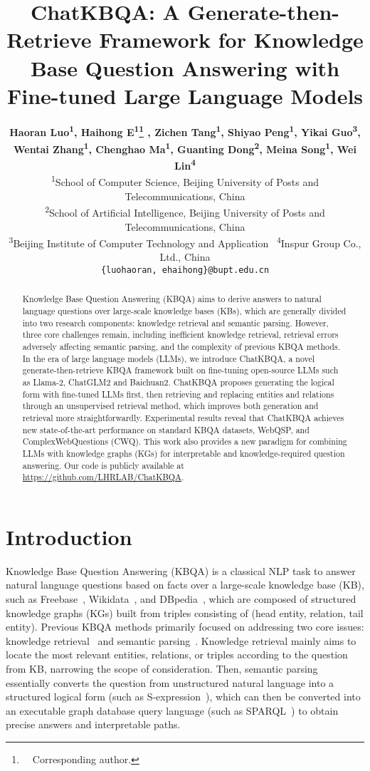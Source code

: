 \documentclass{article} \usepackage{iclr2024_conference,times}
\title{ChatKBQA: A Generate-then-Retrieve Framework for Knowledge Base Question Answering with Fine-tuned Large Language Models}
\author{{\bf Haoran Luo\textsuperscript{\rm 1}, Haihong E\textsuperscript{\rm 1}\thanks{\ \ Corresponding author.}  , Zichen Tang\textsuperscript{\rm 1}, Shiyao Peng\textsuperscript{\rm 1}, Yikai Guo\textsuperscript{\rm 3},} \\{\bf Wentai Zhang\textsuperscript{\rm 1}, Chenghao Ma\textsuperscript{\rm 1}, Guanting Dong\textsuperscript{\rm 2}, Meina Song\textsuperscript{\rm 1}, Wei Lin\textsuperscript{\rm 4}} \\
         \textsuperscript{1}School of Computer Science, Beijing University of Posts and Telecommunications, China \\ 
         \textsuperscript{2}School of Artificial Intelligence, Beijing University of Posts and Telecommunications, China \\ 
         \textsuperscript{3}Beijing Institute of Computer Technology and Application 
         \ \textsuperscript{4}Inspur Group Co., Ltd., China \\ 
         \texttt{\{luohaoran, ehaihong\}@bupt.edu.cn}}
\begin{document}
\maketitle

\begin{abstract}
Knowledge Base Question Answering (KBQA) aims to derive answers to natural language questions over large-scale knowledge bases (KBs), which are generally divided into two research components: knowledge retrieval and semantic parsing. However, three core challenges remain, including inefficient knowledge retrieval, retrieval errors adversely affecting semantic parsing, and the complexity of previous KBQA methods. In the era of large language models (LLMs), we introduce ChatKBQA, a novel generate-then-retrieve KBQA framework built on fine-tuning open-source LLMs such as Llama-2, ChatGLM2 and Baichuan2. ChatKBQA proposes generating the logical form with fine-tuned LLMs first, then retrieving and replacing entities and relations through an unsupervised retrieval method, which improves both generation and retrieval more straightforwardly. Experimental results reveal that ChatKBQA achieves new state-of-the-art performance on standard KBQA datasets, WebQSP, and ComplexWebQuestions (CWQ). This work also provides a new paradigm for combining LLMs with knowledge graphs (KGs) for interpretable and knowledge-required question answering. 
Our code is publicly available at \url{https://github.com/LHRLAB/ChatKBQA}.

\end{abstract}

\section{Introduction}

Knowledge Base Question Answering (KBQA) is a classical NLP task to answer natural language questions based on facts over a large-scale knowledge base (KB), such as Freebase~\citep{Freebase}, Wikidata~\citep{Wikidata}, and DBpedia~\citep{DBpedia}, which are composed of structured knowledge graphs (KGs) built from triples consisting of (head entity, relation, tail entity). Previous KBQA methods primarily focused on addressing two core issues: knowledge retrieval~\citep{KR} and semantic parsing~\citep{SP}. Knowledge retrieval mainly aims to locate the most relevant entities, relations, or triples according to the question from KB, narrowing the scope of consideration. Then, semantic parsing essentially converts the question from unstructured natural language into a structured logical form (such as S-expression~\citep{GrailQA}), which can then be converted into an executable graph database query language (such as SPARQL~\citep{SPARQL}) to obtain precise answers and interpretable paths.
\end{document}
